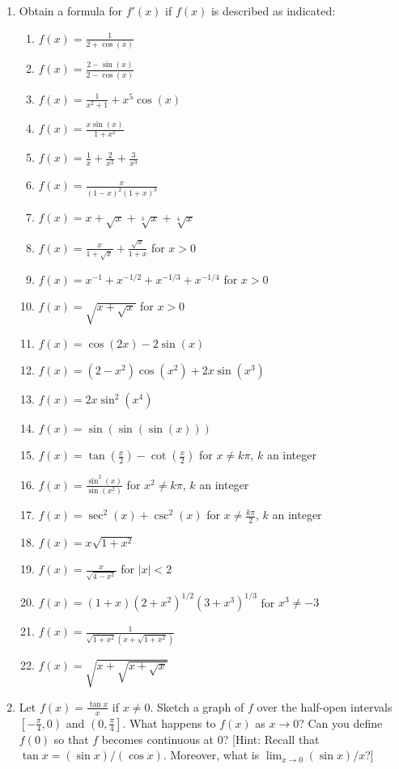 \documentclass[11pt]{article}
\begin{document}
\begin{enumerate}
\item Obtain a formula for $f'(x)$ if $f(x)$ is described as
  indicated:
  \begin{enumerate}
  \item $f(x) = \frac{1}{2+\cos (x)}$
  \item $f(x) = \frac{2-\sin (x)}{2-\cos (x)}$
  \item $f(x) = \frac{1}{x^2+1} + x^5\cos (x)$
  \item $f(x) = \frac{x\sin (x)}{1+x^2}$
  \item $f(x) = \frac{1}{x} + \frac{2}{x^2} + \frac{3}{x^3}$
  \item $f(x) = \frac{x}{(1-x)^2(1+x)^3}$
  \item $f(x) = x + \sqrt{x} + \sqrt[3]{x} + \sqrt[4]{x}$
  \item $f(x) = \frac{x}{1+\sqrt{x}} + \frac{\sqrt{x}}{1+x}$ for $x > 0$
  \item $f(x) = x^{-1} + x^{-1/2} + x^{-1/3} + x^{-1/4}$ for $x>0$
  \item $f(x) = \sqrt{x+\sqrt{x}}$ for $x>0$
  \item $f(x) = \cos(2x) - 2\sin(x)$
  \item $f(x) =(2-x^2)\cos(x^2) + 2x\sin(x^3)$
  \item $f(x) = 2x\sin^2(x^4)$
  \item $f(x) = \sin(\sin(\sin(x)))$
  \item $f(x) = \tan\left(\frac{x}{2}\right) -
    \cot\left(\frac{x}{2}\right)$ for $x \ne k\pi$, $k$ an integer
  \item $f(x) = \frac{\sin^2(x)}{\sin(x^2)}$ for $x^2 \ne k\pi$, $k$ an integer
  \item $f(x) = \sec^2(x) + \csc^2(x)$ for $x \ne \frac{k\pi}{2}$, $k$
    an integer
  \item $f(x) = x\sqrt{1+x^2}$
  \item $f(x) = \frac{x}{\sqrt{4-x^2}}$ for $|x|<2$
  \item $f(x) = (1+x)(2+x^2)^{1/2}(3+x^3)^{1/3}$ for $x^3 \ne -3$
  \item $f(x) = \frac{1}{\sqrt{1+x^2}\left(x+\sqrt{1+x^2}\right)}$
  \item $f(x) = \sqrt{x+\sqrt{x+\sqrt{x}}}$
  \end{enumerate}


\item Let $\displaystyle f(x) = \frac{\tan x}{x}$ if $x \ne 0$.
  Sketch a graph of $f$ over the half-open intervals
  $\left[-\frac{\pi}{4},0\right)$ and $\left(0,\frac{\pi}{4}\right]$.
  What happens to $f(x)$ as $x \to 0$?  Can you define $f(0)$ so that
  $f$ becomes continuous at $0$?  [{\sc Hint}: Recall that $\tan x =
  (\sin x)/(\cos x)$.  Moreover, what is $\lim_{x \to 0} (\sin x)/x$?]



\end{enumerate}
\end{document}
